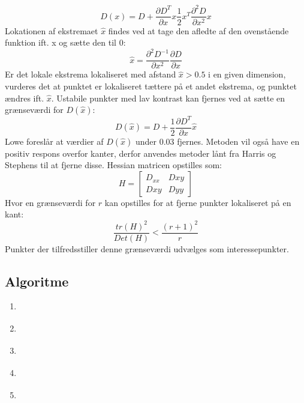 \begin{equation}
D(x)=D+\dfrac{\partial D^T}{\partial x}x\dfrac{1}{2}x^T\dfrac{\partial^2D}{\partial x^2}x
\end{equation}
Lokationen af ekstremaet $\hat{x}$ findes ved at tage den afledte af den ovenstående funktion ift. x og sætte den til 0:
\begin{equation}
\hat{x}= \dfrac{\partial^2 D^{-1}}{\partial x^2}\dfrac{\partial D}{\partial x}
\end{equation}
Er det lokale ekstrema lokaliseret med afstand $\hat{x}>0.5$ i en given dimension, vurderes det at punktet er lokaliseret tættere på et andet ekstrema, og punktet ændres ift. $\hat{x}$. Ustabile punkter med lav kontrast kan fjernes ved at sætte en grænseværdi for $ D(\hat{x}) $:
\begin{equation}
D(\hat{x})=D+\dfrac{1}{2}\dfrac{\partial D^T}{\partial x}\hat{x}
\end{equation}
Lowe foreslår at værdier af $D(\hat{x})$ under 0.03 fjernes. Metoden vil også have en positiv respons overfor kanter, derfor anvendes metoder lånt fra Harris og Stephens \cite{harris} til at fjerne disse. Hessian matricen opstilles som:
\begin{equation}
H =
\begin{bmatrix}
D_{xx} & D{xy} \\
D{xy} & D{yy}
\end{bmatrix}
\end{equation}
Hvor en grænseværdi for $r$ kan opstilles for at fjerne punkter lokaliseret på en kant:
\begin{equation}
\dfrac{tr(H)^2}{Det(H)}<\dfrac{(r+1)^2}{r}
\end{equation}
Punkter der tilfredsstiller denne grænseværdi udvælges som interessepunkter.
\subsection*{Algoritme}
\begin{enumerate}
\item{ }
\item{ }
\item{ }
\item{ }
\item{ }
\end{enumerate}